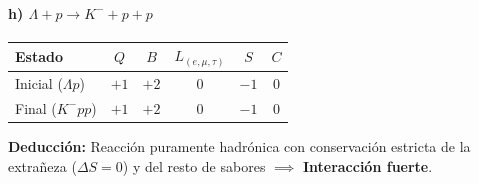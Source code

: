 \begin{problema}
\paragraph{h) $\Lambda + p \rightarrow K^- + p + p$}
\begin{center}
\small
\begin{tabular}{lccccc}
\toprule
\textbf{Estado} & $Q$ & $B$ & $L_{(e,\mu,\tau)}$ & $S$ & $C$ \\
\midrule
Inicial ($\Lambda p$) & $+1$ & $+2$ & $0$ & $-1$ & $0$ \\
Final ($K^- p p$) & $+1$ & $+2$ & $0$ & $-1$ & $0$ \\
\bottomrule
\end{tabular}
\end{center}
\textbf{Deducción:} Reacción puramente hadrónica con conservación estricta de la extrañeza ($\Delta S = 0$) y del resto de sabores $\implies$ \textbf{Interacción fuerte}.
\end{problema}

